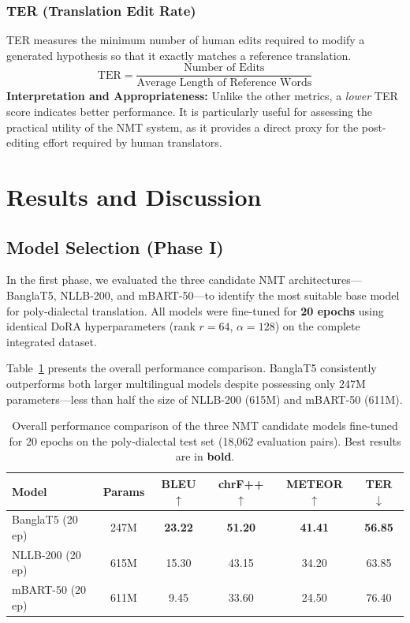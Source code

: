 \documentclass[12pt,a4paper]{article}
\begin{document}
\subsubsection{TER (Translation Edit Rate)}
TER \cite{snover2006study} measures the minimum number of human edits required to modify a generated hypothesis so that it exactly matches a reference translation.
\begin{equation}
\text{TER} = \frac{\text{Number of Edits}}{\text{Average Length of Reference Words}}
\end{equation}
\textbf{Interpretation and Appropriateness:} Unlike the other metrics, a \textit{lower} TER score indicates better performance. It is particularly useful for assessing the practical utility of the NMT system, as it provides a direct proxy for the post-editing effort required by human translators.


\section{Results and Discussion}

\subsection{Model Selection (Phase I)}
In the first phase, we evaluated the three candidate NMT architectures---BanglaT5, NLLB-200, and mBART-50---to identify the most suitable base model for poly-dialectal translation. All models were fine-tuned for \textbf{20 epochs} using identical DoRA hyperparameters (rank $r=64$, $\alpha=128$) on the complete integrated dataset.

Table~\ref{tab:model_results_search} presents the overall performance comparison. BanglaT5 consistently outperforms both larger multilingual models despite possessing only 247M parameters---less than half the size of NLLB-200 (615M) and mBART-50 (611M).

\begin{table}[htbp]
\centering
\small
\caption{Overall performance comparison of the three NMT candidate models fine-tuned for 20 epochs on the poly-dialectal test set (18,062 evaluation pairs). Best results are in \textbf{bold}.}
\label{tab:model_results_search}
\begin{tabular}{l c c c c c}
\toprule
\textbf{Model} & \textbf{Params} & \textbf{BLEU $\uparrow$} & \textbf{chrF++ $\uparrow$} & \textbf{METEOR $\uparrow$} & \textbf{TER $\downarrow$} \\
\midrule
BanglaT5 (20 ep) & 247M & \textbf{23.22} & \textbf{51.20} & \textbf{41.41} & \textbf{56.85} \\
NLLB-200 (20 ep) & 615M & 15.30 & 43.15 & 34.20 & 63.85 \\
mBART-50 (20 ep) & 611M &  9.45 & 33.60 & 24.50 & 76.40 \\
\bottomrule
\end{tabular}
\end{table}
\end{document}
